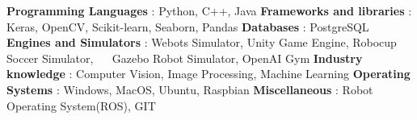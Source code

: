 \begin{cventries}  
\skillentry
    {
    \bullet \space \textbf{Programming Languages} : Python, C++, Java \newline
    \bullet \space \textbf{Frameworks and libraries} : Keras, OpenCV, Scikit-learn, Seaborn, Pandas\newline
    \bullet \space \textbf{Databases} : PostgreSQL \newline
    \bullet \space \textbf{Engines and Simulators} : Webots Simulator, Unity Game Engine, Robocup Soccer Simulator, \newline $\quad$ Gazebo Robot Simulator, OpenAI Gym \newline
    \bullet \space \textbf{Industry knowledge} : Computer Vision, Image Processing, Machine Learning \newline
    \bullet \space \textbf{Operating Systems} : Windows, MacOS, Ubuntu, Raspbian \newline
    \bullet \space \textbf{Miscellaneous} : Robot Operating System(ROS), GIT
    }
\end{cventries}
